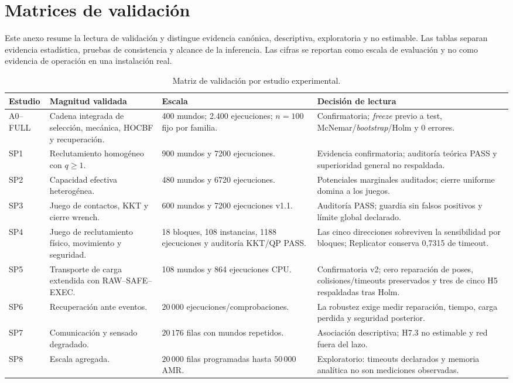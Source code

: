 \section{Matrices de validación}

Este anexo resume la lectura de validación y distingue evidencia canónica, descriptiva, exploratoria y no estimable. Las tablas separan evidencia estadística, pruebas de consistencia y alcance de la inferencia. Las cifras se reportan como escala de evaluación y no como evidencia de operación en una instalación real.

\begin{table}[H]
\centering
\scriptsize
\begin{tabularx}{\textwidth}{@{}p{}p{}p{}X@{}}
\toprule
Estudio & Magnitud validada & Escala & Decisión de lectura \\
\midrule
A0--FULL & Cadena integrada de selección, mecánica, HOCBF y recuperación. & 400 mundos; 2.400 ejecuciones; $n=100$ fijo por familia. & Confirmatoria; \emph{freeze} previo a test, McNemar/\emph{bootstrap}/Holm y 0 errores. \\
SP1 & Reclutamiento homogéneo con $q\geq1$. & 900 mundos y 7200 ejecuciones. & Evidencia confirmatoria; auditoría teórica PASS y superioridad general no respaldada. \\
SP2 & Capacidad efectiva heterogénea. & 480 mundos y 6720 ejecuciones. & Potenciales marginales auditados; cierre uniforme domina a los juegos. \\
SP3 & Juego de contactos, KKT y cierre wrench. & 600 mundos y 7200 ejecuciones v1.1. & Auditoría PASS; guardia sin falsos positivos y límite global declarado. \\
SP4 & Juego de reclutamiento físico, movimiento y seguridad. & 18 bloques, 108 instancias, 1188 ejecuciones y auditoría KKT/QP PASS. & Las cinco direcciones sobreviven la sensibilidad por bloques; Replicator conserva 0,7315 de timeout. \\
SP5 & Transporte de carga extendida con RAW--SAFE--EXEC. & 108 mundos y 864 ejecuciones CPU. & Confirmatoria v2; cero reparación de poses, colisiones/timeouts preservados y tres de cinco H5 respaldadas tras Holm. \\
SP6 & Recuperación ante eventos. & $20\,000$ ejecuciones/comprobaciones. & La robustez exige medir reparación, tiempo, carga perdida y seguridad posterior. \\
SP7 & Comunicación y sensado degradado. & $20\,176$ filas con mundos repetidos. & Asociación descriptiva; H7.3 no estimable y red fuera del lazo. \\
SP8 & Escala agregada. & $20\,000$ filas programadas hasta $50\,000$ AMR. & Exploratorio: timeouts declarados y memoria analítica no son mediciones observadas. \\
\bottomrule
\end{tabularx}
\caption{Matriz de validación por estudio experimental.}
\label{tab:matriz-validacion-sp}
\end{table}

